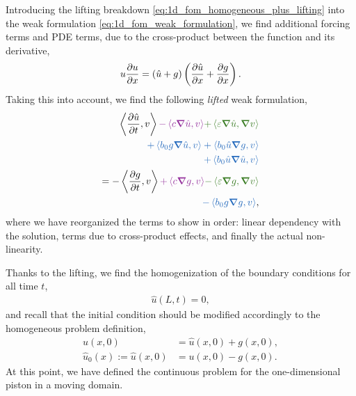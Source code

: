 \documentclass[../../thesis.tex]{subfiles}
\newcommand{\inner}[2]{\left<#1, #2\right>}
\begin{document}
Introducing the lifting breakdown \eqref{eq:1d_fom_homogeneous_plus_lifting} into the weak formulation \eqref{eq:1d_fom_weak_formulation},
we find additional forcing terms and PDE terms, due to the cross-product between the function and its derivative, 
\begin{equation}
    u \pdv{u}{x} = \left(\hat{u} + g\right)\left(\pdv{\hat{u}}{x} + \pdv{g}{x}\right).
\end{equation}
Taking this into account, we find the following \textit{lifted} weak formulation,
\begin{subequations}
    \begin{align}
        \inner{\frac{\partial \hat{u}}{\partial t}}{v} \textcolor{Purple}{- \inner{c \grad \hat{u}}{v}} \textcolor{OliveGreen}{+ \inner{\varepsilon \grad \hat{u}}{\grad v}} \nonumber\\
        \textcolor{NavyBlue}{+ \inner{b_0 g \grad \hat{u}}{v}
        + \inner{b_0 \hat{u} \grad g}{v}} \nonumber\\
        \textcolor{NavyBlue}{+ \inner{b_0 \hat{u} \grad \hat{u}}{v}} \nonumber\\
        = 
        - \inner{\frac{\partial g}{\partial t}}{v} \textcolor{Purple}{+ \inner{c \grad g}{v}} \textcolor{OliveGreen}{- \inner{\varepsilon \grad g}{\grad v}} \nonumber\\ 
        \textcolor{NavyBlue}{- \inner{b_0 g \grad g}{v}},
    \end{align}
\end{subequations}
where we have reorganized the terms to show in order: linear dependency with the solution, terms due to cross-product effects, and finally the actual non-linearity.

Thanks to the lifting, we find the homogenization of the boundary conditions for all time $t$,
\begin{subequations}
    \begin{align}
        \hat{u}(L, t) = 0,
    \end{align}
\end{subequations}
and recall that the initial condition should be modified accordingly to the homogeneous problem definition, 
\begin{subequations}
    \begin{align}
    u(x,0) &= \hat{u}(x,0) + g(x,0), \\ 
    \hat{u}_0(x):= \hat{u}(x,0) &= u(x,0) - g(x,0). 
    \end{align}
\end{subequations}
At this point, we have defined the continuous problem for the one-dimensional piston in a moving domain.
\end{document}
